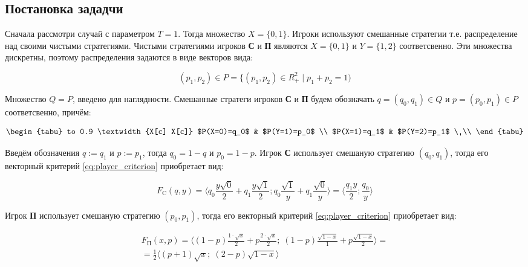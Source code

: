 \subsection{Постановка зададчи}

Сначала рассмотри случай с параметром $T=1$. Тогда множество $X=\{0, 1\}$.
Игроки используют смешанные стратегии т.е. распределение над своими чистыми стратегиями.
Чистыми стратегиями игроков \textbf{С} и \textbf{П} являются $X=\{0, 1\}$ и $Y=\{1,2\}$ 
соответсвенно. Эти множества дискретны, поэтому распределения задаются в виде векторов 
вида: 

$$(p_1, p_2) \in P = \{(p_1, p_2) \in R_+^2 \; | \; p_1 + p_2 = 1)$$

Множество $Q=P$, введено для наглядности. 
Смешанные стратеги игроков \textbf{С} и \textbf{П} будем обозначать
$q=(q_0,q_1) \in Q$ и $p=(p_0,p_1) \in P$ соответсвенно, причём:

\begin{equation}
\begin{tabu} to 0.9 \textwidth {X[c] X[c]}
	$P(X=0)=q_0$ & $P(Y=1)=p_0$ \\
	$P(X=1)=q_1$ & $P(Y=2)=p_1$ \
	\\
	\end{tabu}	
\label{eq:probability_1}
\end{equation}

Введём обозначения $q := q_1$ и $p := p_1$, тогда $q_0 = 1-q$ и $p_0 = 1 - p$. 
Игрок \textbf{С} использует смешаную стратегию  $(q_0,q_1)$, тогда
его векторный критерий \eqref{eq:player_criterion} приобретает вид: 

$$
	F_\textrm{C}(q,y)=
	\big \langle
		q_0\frac{y\sqrt{0}}{2} + 
		q_1\frac{y\sqrt{1}}{2};
		q_0\frac{\sqrt{1}}{y} +
		q_1\frac{\sqrt{0}}{y}
	\big \rangle 
	= 	
	\big \langle
		\frac{q_1y}{2};
		\frac{q_0}{y}
	\big \rangle 
$$

Игрок \textbf{П} использует смешаную стратегию  $(p_0,p_1)$, тогда
его векторный критерий \eqref{eq:player_criterion} приобретает вид: 

\begin{gather*}
	F_\textrm{П}(x,p)=
	\big \langle 
		(1-p)\frac{1 \cdot \sqrt{x}}{2} + p \frac{2 \cdot \sqrt{x}}{2}; \;
		(1-p)\frac{\sqrt{1-x}}{1}+p\frac{\sqrt{1-x}}{2} 
	\big \rangle=
	\\
	=\frac{1}{2}
	\big \langle
		(p+1)\sqrt{x}; \;
		(2-p)\sqrt{1-x}
	\big \rangle
\end{gather*}
	
\vspace{5mm}


